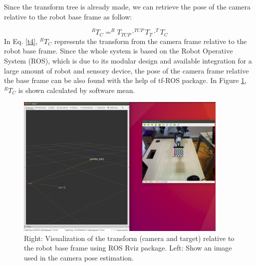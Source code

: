Since the transform tree is already made, we can retrieve the pose of the camera relative to the robot base frame as follow:

\begin{equation}
^{R}T_{C}= ^{R}T_{TCP} \cdot ^{TCP}T_{T} \cdot ^{T}T_{C}\label{t4}
\end{equation}
In Eq. \ref{t4}, $^{R}T_{C}$ represents the transform from the camera frame relative to the robot base frame. Since the whole system is based on the Robot Operative System (ROS), which is due to its modular design and available integration for a large amount of robot and sensory device, the pose of the camera frame relative the base frame can be also found with the help of tf-ROS package. In Figure \ref{fig:tf6}, $^{R}T_{C}$ is shown calculated by software mean. 


\begin{figure}[!h]
\begin{center}
\includegraphics[width=4in]{figures03/rviz1.png}
\caption{Right: Visualization of the transform (camera and target) relative to the robot base frame using ROS Rviz package. Left: Show an image used in the camera pose estimation.}
\label{fig:tf6}
\end{center}
\end{figure}































